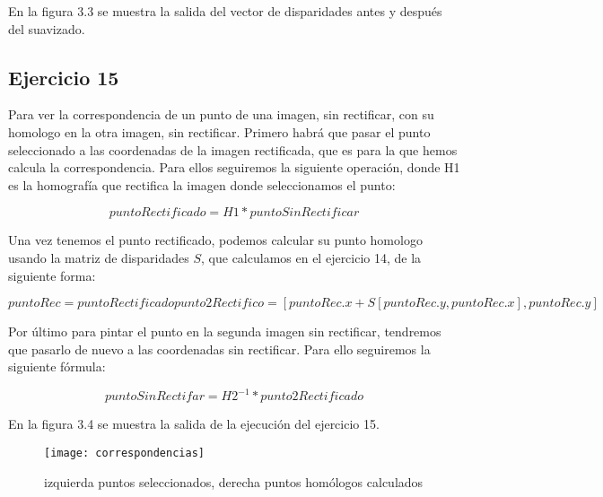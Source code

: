 \documentclass[paper=a4, fontsize=11pt]{scrartcl} %
\numberwithin{equation}{section} %
\numberwithin{figure}{section} %
\numberwithin{table}{section} %
\begin{document}
En la figura 3.3 se muestra la salida del vector de disparidades antes y después del suavizado.

\subsection{Ejercicio 15}

Para ver la correspondencia de un punto de una imagen, sin rectificar, con su homologo en la otra imagen, sin rectificar. Primero habrá que pasar el punto seleccionado a las coordenadas de la imagen rectificada, que es para la que hemos calcula la correspondencia. Para ellos seguiremos la siguiente operación, donde H1 es la homografía que rectifica la imagen donde seleccionamos el punto:

\begin{equation}
	puntoRectificado = H1 * puntoSinRectificar
\end{equation}

Una vez tenemos el punto rectificado, podemos calcular su punto homologo usando la matriz de disparidades $S$, que calculamos en el ejercicio 14, de la siguiente forma:

\begin{equation}
	puntoRec = puntoRectificado
	punto2Rectifico = [puntoRec.x + S[puntoRec.y, puntoRec.x],puntoRec.y]
\end{equation}

Por último para pintar el punto en la segunda imagen sin rectificar, tendremos que pasarlo de nuevo a las coordenadas sin rectificar. Para ello seguiremos la siguiente fórmula:

\begin{equation}
	puntoSinRectifar = H2^{-1} * punto2Rectificado
\end{equation}

En la figura 3.4 se muestra la salida de la ejecución del ejercicio 15.

\begin{figure}
	\centering
	\texttt{[image: correspondencias]}
	\caption{izquierda puntos seleccionados, derecha puntos homólogos calculados}
	\label{fig:fig}
\end{figure}

\end{document}
